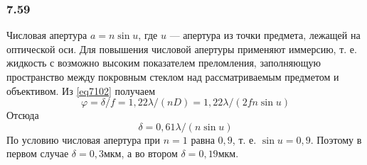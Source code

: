 \subsubsection*{7.59}
Числовая апертура $a = n \sin u$, где $u$ --- апертура из точки предмета, лежащей на оптической оси. Для повышения  числовой апертуры применяют иммерсию, т. е. жидкость с возможно высоким показателем преломления, заполняющую пространство между покровным стеклом над рассматриваемым предметом и объективом. Из \ref{eq7102} получаем 
\begin{equation*}
	\varphi = \delta / f   = 1,22 \lambda / (nD) = 1,22 \lambda / (2fn \sin u)
\end{equation*} 
Отсюда
\begin{equation*}
	\delta = 0,61 \lambda / (n \sin u)
\end{equation*}
По условию числовая апертура при $n = 1$ равна $0,9$, т. е. $\sin u = 0,9$. Поэтому в первом случае $\delta = 0,3 мкм$, а во втором $\delta = 0,19 мкм$.